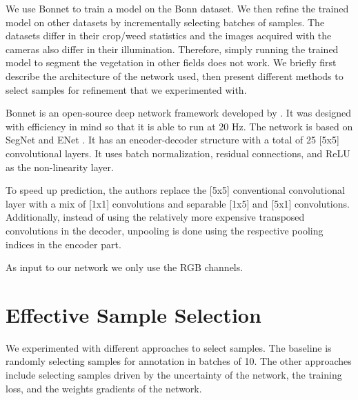 \documentclass[letterpaper, 10 pt, conference]{ieeeconf}  %
\begin{document}
We use Bonnet \cite{milioto2018bonnet} to train a model on the Bonn dataset. We then refine the trained model on other datasets by incrementally selecting batches of samples. The datasets differ in their crop/weed statistics and the images acquired with the cameras also differ in their illumination. Therefore, simply running the trained model to segment the vegetation in other fields does not work. We briefly first describe the architecture of the network used, then present different methods to select samples for refinement that we experimented with.


Bonnet is an open-source deep network framework developed by \cite{milioto2018bonnet}. It was designed with efficiency in mind so that it is able to run at 20 Hz. The network is based on SegNet \cite{badrinarayanan2017segnet} and ENet \cite{paszke2016enet}. It has an encoder-decoder structure with a total of 25 [5x5] convolutional layers. It uses batch normalization, residual connections, and ReLU as the non-linearity layer. 

To speed up prediction, the authors replace the [5x5] conventional convolutional layer with a mix of [1x1] convolutions and separable [1x5] and [5x1] convolutions. Additionally, instead of using the relatively more expensive transposed convolutions in the decoder, unpooling is done using the respective pooling indices in the encoder part.

As input to our network we only use the RGB channels.


%
%
%
%
%
%


\section{Effective Sample Selection}

We experimented with different approaches to select samples. The baseline is randomly selecting samples for annotation in batches of 10. The other approaches include selecting samples driven by the uncertainty of the network, the training loss, and the weights gradients of the network.   
\end{document}
